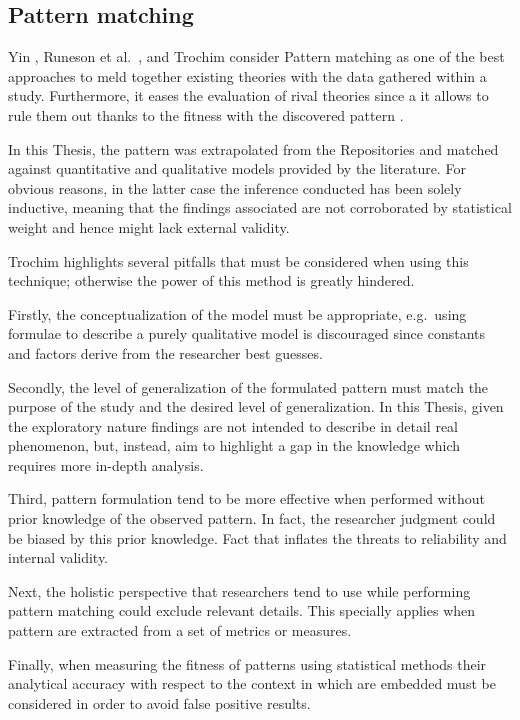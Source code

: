 \subsection{Pattern matching}
Yin \cite{case_study_guide}, Runeson et al.\ \cite{case_study_software_engineering}, and Trochim \cite{pattern_matching} consider Pattern matching as one of the best approaches to meld together existing theories with the data gathered within a study. Furthermore, it eases the evaluation of rival theories since a it allows to rule them out thanks to the fitness with the discovered pattern \cite{pattern_matching}.

In this Thesis, the pattern was extrapolated from the Repositories and matched against quantitative and qualitative models provided by the literature. For obvious reasons, in the latter case the inference conducted has been solely inductive, meaning that the findings associated are not corroborated by statistical weight and hence might lack external validity.


Trochim \cite{pattern_matching} highlights several pitfalls that must be considered when using this technique; otherwise the power of this method is greatly hindered. 

Firstly, the conceptualization of the model must be appropriate, e.g.\ using formulae to describe a purely qualitative model is discouraged since constants and factors derive from the researcher best guesses.

Secondly, the level of generalization of the formulated pattern must match the purpose of the study and the desired level of generalization. In this Thesis, given the exploratory nature findings are not intended to describe in detail real phenomenon, but, instead, aim to highlight a gap in the knowledge which requires more in-depth analysis.

Third, pattern formulation tend to be more effective when performed without prior knowledge of the observed pattern. In fact, the researcher judgment could be biased by this prior knowledge. Fact that inflates the threats to reliability and internal validity.

Next, the holistic perspective that researchers tend to use while performing pattern matching could exclude relevant details. This specially applies when pattern are extracted from a set of metrics or measures.

Finally, when measuring the fitness of patterns using statistical methods their analytical accuracy with respect to the context in which are embedded must be considered in order to avoid false positive results.


